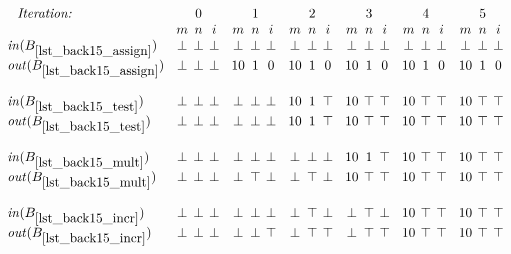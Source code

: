 \begin{minipage}{5in}
\begin{math}
  \setlength{\arraycolsep}{2pt}
  \begin{array}{l@{\phantom{X}}ccc@{\phantom{X}}ccc@{\phantom{X}}ccc@{\phantom{X}}ccc@{\phantom{X}}ccc@{\phantom{X}}ccc}
    \rlap{\hfil\phantom{X}\textit{Iteration:}} &
    & 0 & & 
    & 1 & & 
    & 2 & & 
    & 3 & &
    & 4 & &
    & 5 & \\ 

    & %
    m & n & i & %
    m & n & i & %
    m & n & i & %
    m & n & i & %
    m & n & i & %
    m & n & i \\ %

    \inB{lst_back15_assign} & %
    \bot & \bot & \bot & %
    \bot & \bot & \bot & %
    \bot & \bot & \bot & %
    \bot & \bot & \bot & %
    \bot & \bot & \bot & %
    \bot & \bot & \bot \\ %
    \outB{lst_back15_assign} & %
    \bot & \bot & \bot & %
    10 & 1 & 0 & %
    10 & 1 & 0 & %
    10 & 1 & 0 & %
    10 & 1 & 0 & %
    10 & 1 & 0 \\\\ %

    \inB{lst_back15_test} & %
    \bot & \bot & \bot & %
    \bot & \bot & \bot & %
    10 & 1 & \top & %
    10 & \top & \top & %
    10 & \top & \top & %
    10 & \top & \top\\ %
    \outB{lst_back15_test} & %
    \bot & \bot & \bot & %
    \bot & \bot & \bot & %
    10 & 1 & \top & %
    10 & \top & \top & %
    10 & \top & \top & %
    10 & \top & \top \\\\ %

    \inB{lst_back15_mult} & %
    \bot & \bot & \bot & %
    \bot & \bot & \bot & %
    \bot & \bot & \bot & %
    10 & 1 & \top & %
    10 & \top & \top & %
    10 & \top & \top \\ %
    \outB{lst_back15_mult} & %
    \bot & \bot & \bot & %
    \bot & \top & \bot & %
    \bot & \top & \bot & %
    10 & \top & \top & %
    10 & \top & \top & %
    10 & \top & \top \\\\ %

    \inB{lst_back15_incr} & %
    \bot & \bot & \bot & %
    \bot & \bot & \bot & %
    \bot & \top & \bot & %
    \bot & \top & \bot & %
    10 & \top & \top & %
    10 & \top & \top \\ %
    \outB{lst_back15_incr} & %
    \bot & \bot & \bot & %
    \bot & \bot & \top & %
    \bot & \top & \top & %
    \bot & \top & \top & %
    10 & \top & \top & %
    10 & \top & \top \\\\ %


\end{array}
\end{math}
\end{minipage}
